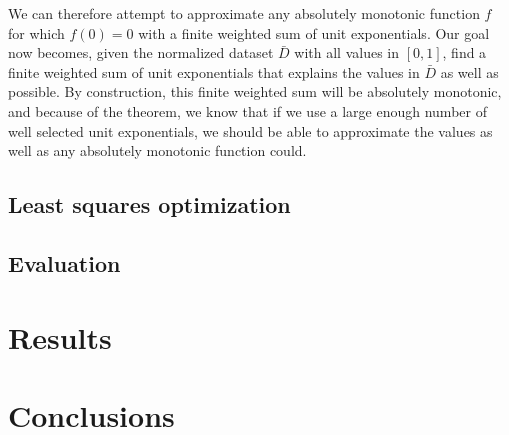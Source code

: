 \documentclass[12pt,a4paper]{article}
\begin{document}
We can therefore attempt to approximate any absolutely monotonic function $f$ for which $f(0) = 0$ with a finite weighted sum of unit exponentials. Our goal now becomes, given the normalized dataset $\bar{D}$ with all values in $[0,1]$, find a finite weighted sum of unit exponentials that explains the values in $\bar{D}$ as well as possible. By construction, this finite weighted sum will be absolutely monotonic, and because of the theorem, we know that if we use a large enough number of well selected unit exponentials, we should be able to approximate the values as well as any absolutely monotonic function could.

\subsection{Least squares optimization}
\label{least_squares}

\subsection{Evaluation}

\section{Results}

\section{Conclusions}

\dobibliography
\end{document}
